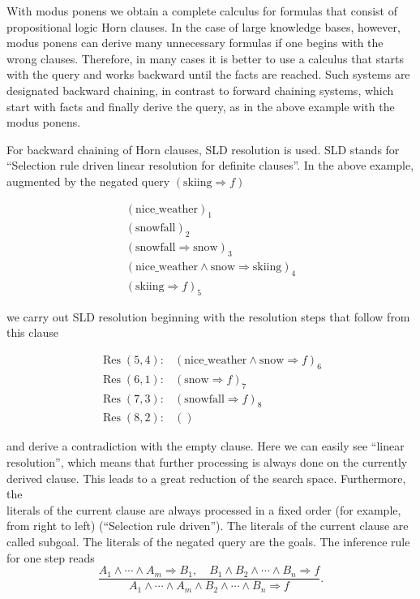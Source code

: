 \documentclass[10pt]{book}
\begin{document}
With modus ponens we obtain a complete calculus for formulas that consist of propositional logic Horn clauses. In the case of large knowledge bases, however, modus ponens can derive many unnecessary formulas if one begins with the wrong clauses. Therefore, in many cases it is better to use a calculus that starts with the query and works backward until the facts are reached. Such systems are designated backward chaining, in contrast to forward chaining systems, which start with facts and finally derive the query, as in the above example with the modus ponens.

For backward chaining of Horn clauses, SLD resolution is used. SLD stands for ``Selection rule driven linear resolution for definite clauses''. In the above example, augmented by the negated query $(\text{skiing} \Rightarrow f)$

\[
\begin{array}{l}
(\text{nice\_weather})_{1} \\
(\text{snowfall})_{2} \\
(\text{snowfall} \Rightarrow \text{snow})_{3} \\
(\text{nice\_weather} \wedge \text{snow} \Rightarrow \text{skiing})_{4} \\
(\text{skiing} \Rightarrow f)_{5}
\end{array}
\]

we carry out SLD resolution beginning with the resolution steps that follow from this clause

$$
\begin{array}{ll}
\operatorname{Res}(5,4): & (\text{nice\_weather} \wedge \text{snow} \Rightarrow f)_{6} \\
\operatorname{Res}(6,1): & (\text{snow} \Rightarrow f)_{7} \\
\operatorname{Res}(7,3): & (\text{snowfall} \Rightarrow f)_{8} \\
\operatorname{Res}(8,2): & ()
\end{array}
$$

and derive a contradiction with the empty clause. Here we can easily see ``linear resolution'', which means that further processing is always done on the currently derived clause. This leads to a great reduction of the search space. Furthermore, the\\
literals of the current clause are always processed in a fixed order (for example, from right to left) (``Selection rule driven''). The literals of the current clause are called subgoal. The literals of the negated query are the goals. The inference rule for one step reads
$$
\frac{A_{1} \wedge \cdots \wedge A_{m} \Rightarrow B_{1}, \quad B_{1} \wedge B_{2} \wedge \cdots \wedge B_{n} \Rightarrow f}{A_{1} \wedge \cdots \wedge A_{m} \wedge B_{2} \wedge \cdots \wedge B_{n} \Rightarrow f} .
$$
\end{document}
